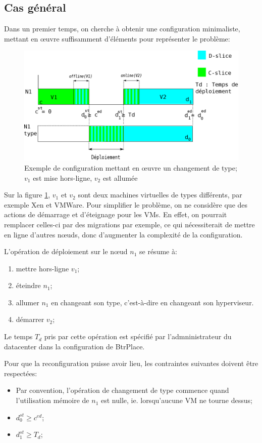 \documentclass[a4paper]{article}
\begin{document}
\subsection{Cas général}
Dans un premier temps, on cherche à obtenir une configuration minimaliste,
mettant en œuvre suffisamment d'éléments pour représenter le problème:
\begin{figure}[!ht]
	\centering
	\includegraphics[scale=.45]{imgs/config.eps}
	\caption{\label{config} Exemple de configuration mettant en œuvre un
		changement de type; $v_1$ est mise hors-ligne, $v_2$ est allumée}
\end{figure}

Sur la figure \ref{config}, $v_1$ et $v_2$ sont deux machines
virtuelles de types différents, par exemple Xen et VMWare.
Pour simplifier le problème, on ne considère que des actions
de démarrage et d'éteignage pour les VMs. En effet, on pourrait
remplacer celles-ci par des migrations par exemple, ce qui
nécessiterait de mettre en ligne d'autres nœuds, donc d'augmenter
la complexité de la configuration.

L'opération de déploiement sur le nœud $n_1$ se résume à:
\begin{enumerate}
	\item mettre hors-ligne $v_1$;
	\item éteindre $n_1$;
	\item allumer $n_1$ en changeant son type, c'est-à-dire en changeant
		son hyperviseur.
	\item démarrer $v_2$;
\end{enumerate}
Le temps $T_d$ pris par cette opération est spécifié par l'admninistrateur
du datacenter dans la configuration de BtrPlace.

Pour que la reconfiguration puisse avoir lieu, les contraintes suivantes
doivent être respectées:
\begin{itemize}
	\item Par convention, l'opération de changement de type commence quand
		l'utilisation mémoire de $n_1$ est nulle, ie. lorsqu'aucune VM
		ne tourne dessus;
	\item $d_0^{st} \geq c^{ed}$;
	\item $d_1^{st} \geq T_d$;
\end{itemize}
\end{document}
